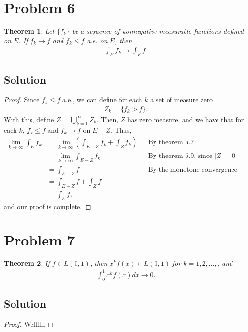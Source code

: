 \documentclass[10pt,a4paper]{article}
\theoremstyle{theorem}
\newtheorem{theorem}{Theorem}
\theoremstyle{definition}
\begin{document}
\section*{Problem 6}
\begin{theorem}
Let $\{f_k \}$ be a sequence of nonnegative measurable functions defined on $E$. If $f_k \to f$ and $f_k \leq f$ a.e. on $E$, then 
\begin{align*}
\int_E f_k \to \int_E f.
\end{align*}
\end{theorem}

\subsection*{Solution}
\begin{proof}
Since $f_k \leq f$ a.e., we can define for each $k$ a set of measure zero
\begin{align*}
Z_k = \{f_k > f \}.
\end{align*}
With this, define $Z = \bigcup_{k=1}^\infty Z_k$. Then, $Z$ has zero measure, and we have that for each $k$, $f_k \leq f$ and $f_k \to f$ on $E - Z$. Thus,
\begin{align*}
\lim_{k \to \infty} \int_E f_k &= \lim_{k \to \infty} \left(\int_{E - Z} f_k + \int_Z f_k \right) && \text{By theorem 5.7}\\
&= \lim_{k \to \infty} \int_{E - Z} f_k &&\text{By theorem 5.9, since } |Z| = 0\\
&= \int_{E - Z} f &&\text{By the monotone convergence theorem}\\
&= \int_{E - Z} f + \int_{Z} f\\
&= \int_{E} f,
\end{align*}
and our proof is complete.
\end{proof}

\section*{Problem 7}
\begin{theorem}
If $f \in L(0, 1)$, then $x^k f(x) \in L(0, 1)$ for $k = 1,2,...,$, and 
\begin{align*}
\int_0^1 x^k f(x) dx \to 0.
\end{align*}
\end{theorem}

\subsection*{Solution}
\begin{proof}
Wellllll
\end{proof}
\end{document}
